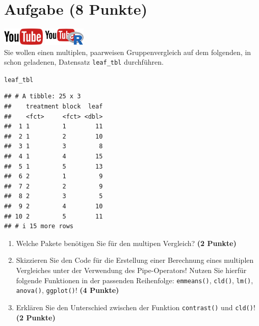 \documentclass[a4paper, 10pt]{scrartcl}\usepackage[]{graphicx}\usepackage[]{xcolor}
\makeatletter
\newcommand{\hlstd}[1]{\textcolor[rgb]{0.345,0.345,0.345}{#1}}%
\newenvironment{kframe}{%
 \def\at@end@of@kframe{}%
 \ifinner\ifhmode%
  \def\at@end@of@kframe{\end{minipage}}%
  \begin{minipage}{\columnwidth}%
 \fi\fi%
 \def\FrameCommand##1{\hskip\@totalleftmargin \hskip-\fboxsep
 \colorbox{shadecolor}{##1}\hskip-\fboxsep
     \hskip-\linewidth \hskip-\@totalleftmargin \hskip\columnwidth}%
 \MakeFramed {\advance\hsize-\width
   \@totalleftmargin\z@ \linewidth\hsize
   \@setminipage}}%
 {\par\unskip\endMakeFramed%
 \at@end@of@kframe}
\newenvironment{knitrout}{}{} %
\makeatother
\begin{document}
 
\clearpage

\section{Aufgabe \hfill (8 Punkte)}

\hfill\href{https://youtu.be/f5fHm_jCHe4}{\includegraphics[width =
  2cm]{img/youtube}}
\hspace{2Ex}
\href{https://youtu.be/_EGebjrOCUQ}{\includegraphics[width =
  2cm]{img/youtube_R}}\\[1Ex]


Sie wollen einen multiplen, paarweisen Gruppenvergleich auf dem folgenden, in \Rlogo schon geladenen, Datensatz \texttt{leaf\_tbl} durchf{\"u}hren.



\begin{knitrout}
\color{fgcolor}\begin{kframe}
\begin{alltt}
\hlstd{leaf_tbl}
\end{alltt}
\begin{verbatim}
## # A tibble: 25 x 3
##    treatment block  leaf
##    <fct>     <fct> <dbl>
##  1 1         1        11
##  2 1         2        10
##  3 1         3         8
##  4 1         4        15
##  5 1         5        13
##  6 2         1         9
##  7 2         2         9
##  8 2         3         5
##  9 2         4        10
## 10 2         5        11
## # i 15 more rows
\end{verbatim}
\end{kframe}
\end{knitrout}

\begin{enumerate}
\item Welche \Rlogo Pakete ben{\"o}tigen Sie f{\"u}r den multipen Vergleich?
  \textbf{(2 Punkte)} 
\item Skizzieren Sie den \Rlogo Code f{\"u}r die Erstellung einer
  Berechnung eines multiplen Vergleiches unter der Verwendung des
  Pipe-Operators! Nutzen Sie hierf{\"u}r folgende Funktionen in der passenden
  Reihenfolge: \texttt{emmeans()},  \texttt{cld()},
  \texttt{lm()},  \texttt{anova()},  \texttt{ggplot()}!  \textbf{(4 Punkte)}
\item Erkl{\"a}ren Sie den Unterschied zwischen der Funktion
  \texttt{contrast()} und \texttt{cld()}!
  \textbf{(2 Punkte)}
\end{enumerate}
\end{document}
